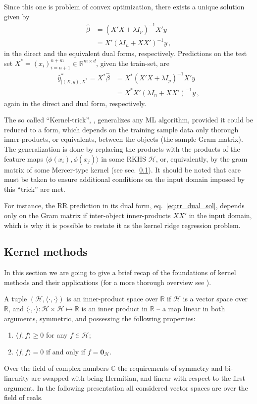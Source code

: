 \documentclass[a4paper,14pt]{extarticle}
\newcommand{\Hcal}{\mathcal{H}}
\newcommand{\Real}{\mathbb{R}}
\newcommand{\nil}{\mathbf{0}}
\newcommand{\Cplx}{\mathbb{C}}
\begin{document}
Since this one is problem of convex optimization, there exists a unique solution
given by 
\begin{align*}
  \hat{\beta}
    &= (X'X + \lambda I_p)^{-1} X' y \\
    &= X' (\lambda I_n + XX')^{-1} y \,,
\end{align*}
in the direct and the equivalent dual forms, respectively. Predictions on the test
set $X^* = (x_i)_{i=n+1}^{n+m}\in \Real^{m\times d}$, given the train-set, are
\begin{align}
  \hat{y}^*_{\vert(X,y), X^*} = X^* \hat{\beta}
    &= X^* (X'X + \lambda I_p)^{-1} X' y \nonumber \\ 
    &= X^* X' (\lambda I_n + XX')^{-1} y \label{eq:rr_dual_sol}\,,
\end{align}
again in the direct and dual form, respectively.

The so called ``Kernel-trick'', \cite{scholkopf2002}, generalizes any ML algorithm,
provided it could be reduced to a form, which depends on the training sample data
only thorough inner-products, or equivalents, between the objects (the sample Gram
matrix). The generalization is done by replacing the products with the products of
the feature maps $\langle\phi(x_i),\phi(x_j)\rangle$ in some RKHS $\Hcal$, or, equivalently,
by the gram matrix of some Mercer-type kernel (see sec.~\ref{sub:kernel_methods}).
It should be noted that care must be taken to ensure additional conditions on the
input domain imposed by this ``trick'' are met.

For instance, the RR prediction in its dual form, eq.~\ref{eq:rr_dual_sol}, depends
only on the Gram matrix if inter-object inner-products $X X'$ in the input domain,
which is why it is possible to restate it as the kernel ridge regression problem.

\subsection{Kernel methods} %
\label{sub:kernel_methods}

In this section we are going to give a brief recap of the foundations of kernel methods
and their applications (for a more thorough overview see \cite{hofmann2008}).

A tuple $(\Hcal, \langle\cdot, \cdot\rangle)$ is an inner-product space over $\Real$
if $\Hcal$ is a vector space over $\Real$, and $\langle\cdot, \cdot\rangle : \Hcal
\times \Hcal \mapsto \Real$ is an inner product in $\Real$ -- a map linear in both
arguments, symmetric, and possessing the following properties:
\begin{enumerate}
  \item $\langle f, f\rangle\geq 0$ for any $f\in \Hcal$;
  \item $\langle f, f\rangle = 0$ if and only if $f = \nil_\Hcal$.
\end{enumerate}
Over the field of complex numbers $\Cplx$ the requirements of symmetry and bi-
linearity are swapped with being Hermitian, and linear with respect to the first
argument. In the following presentation all considered vector spaces are over the
field of reals.
\end{document}

